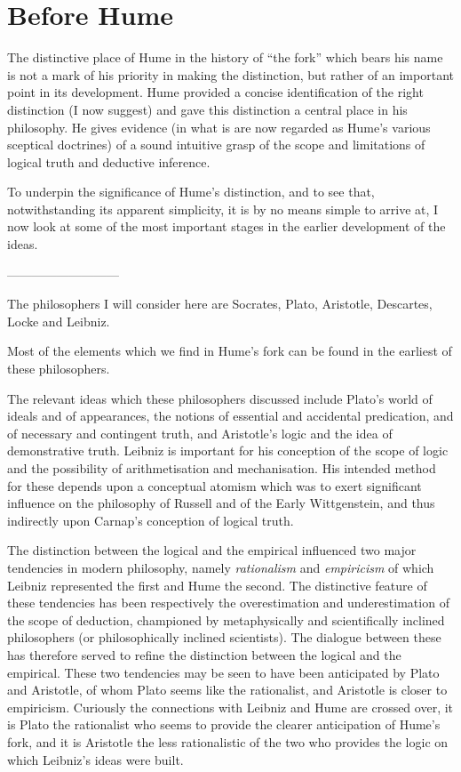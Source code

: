 
\section{Before Hume}\label{Before}

The distinctive place of Hume in the history of ``the fork'' which
bears his name is not a mark of his priority in making the
distinction, but rather of an important point in its development.
Hume provided a concise identification of the right distinction (I now suggest)
and gave this distinction a central place in his philosophy.
He gives evidence (in what is are now regarded as Hume's various
sceptical doctrines) of a sound intuitive grasp of the scope and
limitations of logical truth and deductive inference.

To underpin the significance of Hume's distinction, and to see that,
notwithstanding its apparent simplicity, it is by no means simple to
arrive at, I now look at some of the most important stages in the
earlier development of the ideas.

---------------------------


The philosophers I will consider here are Socrates, Plato, Aristotle,
Descartes, Locke and Leibniz.

Most of the elements which we find in Hume's fork can be found in the
earliest of these philosophers.

The relevant ideas which these philosophers discussed include Plato's
world of ideals and of appearances, the notions of essential and
accidental predication, and of necessary and contingent truth, and
Aristotle's logic and the idea of demonstrative truth.
Leibniz is important for his conception of the scope of logic and the
possibility of arithmetisation and mechanisation.
His intended method for these depends upon a conceptual atomism which
was to exert significant influence on the philosophy of Russell and of
the Early Wittgenstein, and thus indirectly upon Carnap's conception
of logical truth.


The distinction between the logical and the empirical influenced two
major tendencies in modern philosophy, namely \emph{rationalism} and
\emph{empiricism} of which Leibniz represented the first and Hume the
second.
The distinctive feature of these tendencies has been respectively the
overestimation and underestimation of the scope of deduction,
championed by metaphysically and scientifically inclined philosophers
(or philosophically inclined scientists).
The dialogue between these has therefore served to refine the
distinction between the logical and the empirical.
These two tendencies may be seen to have been anticipated by Plato and
Aristotle, of whom Plato seems like the rationalist, and Aristotle is
closer to empiricism.
Curiously the connections with Leibniz and Hume are crossed over, it
is Plato the rationalist who seems to provide the clearer anticipation
of Hume's fork, and it is Aristotle the less rationalistic of the two
who provides the logic on which Leibniz's ideas were built.

